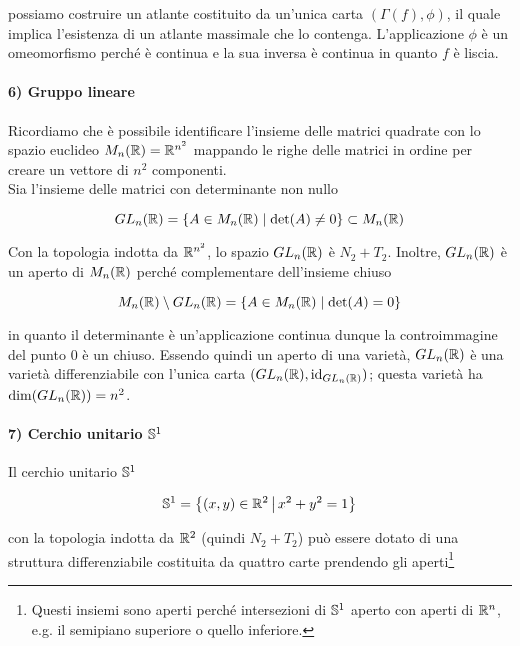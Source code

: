 possiamo costruire un atlante costituito da un'unica carta $ (\Gamma(f),\phi) $, il quale implica l'esistenza di un atlante massimale che lo contenga. L'applicazione $ \phi $ è un omeomorfismo perché è continua e la sua inversa è continua in quanto $ f $ è liscia.

\paragraph{6) Gruppo lineare}

Ricordiamo che è possibile identificare l'insieme delle matrici quadrate con lo spazio euclideo $ M_{n}(\R) = \R^{n^{2}} $ mappando le righe delle matrici in ordine per creare un vettore di $ n^{2} $ componenti.\\
Sia l'insieme delle matrici con determinante non nullo

\begin{equation}
	GL_{n}(\R) = \{ A \in M_{n}(\R) \mid \det(A) \neq 0 \} \subset M_{n}(\R)
\end{equation}

Con la topologia indotta da $ \R^{n^{2}} $, lo spazio $ GL_{n}(\R) $ è $ N_{2}+T_{2} $. Inoltre, $ GL_{n}(\R) $ è un aperto di $ M_{n}(\R) $ perché complementare dell'insieme chiuso

\begin{equation}
	 M_{n}(\R) \setminus GL_{n}(\R) = \{ A \in M_{n}(\R) \mid \det(A) = 0 \}
\end{equation}

in quanto il determinante è un'applicazione continua dunque la controimmagine del punto $ 0 $ è un chiuso. Essendo quindi un aperto di una varietà, $ GL_{n}(\R) $ è una varietà differenziabile con l'unica carta $ (GL_{n}(\R),\id_{GL_{n}(\R)}) $; questa varietà ha $ \dim(GL_{n}(\R)) = n^{2} $.

\paragraph{7) Cerchio unitario $ \S^{1} $}\label{ex-s1}

Il cerchio unitario $ \S^{1} $

\begin{equation}
	\S^{1} = \left\{ (x,y) \in \R^{2} \st x^{2} + y^{2} = 1 \right\}
\end{equation}

con la topologia indotta da $ \R^{2} $ (quindi $ N_{2}+T_{2} $) può essere dotato di una struttura differenziabile costituita da quattro carte prendendo gli aperti\footnote{%
	Questi insiemi sono aperti perché intersezioni di $ \S^{1} $ aperto con aperti di $ \R^{n} $, e.g. il semipiano superiore o quello inferiore.}

